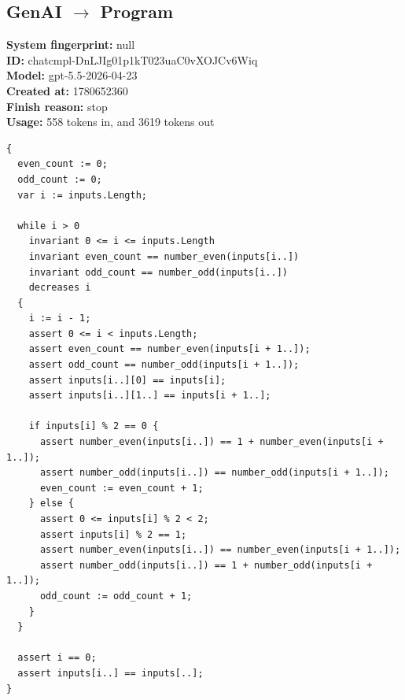 \documentclass{article}
\begin{document}
\subsection*{GenAI $\rightarrow$ Program}
\textbf{System fingerprint: }null
\\\textbf{ID: }chatcmpl-DnLJIg01p1kT023uaC0vXOJCv6Wiq
\\\textbf{Model: }gpt-5.5-2026-04-23
\\\textbf{Created at: }1780652360
\\\textbf{Finish reason: }stop
\\\textbf{Usage: }558 tokens in, and 3619 tokens out
\begin{lstlisting}
{
  even_count := 0;
  odd_count := 0;
  var i := inputs.Length;

  while i > 0
    invariant 0 <= i <= inputs.Length
    invariant even_count == number_even(inputs[i..])
    invariant odd_count == number_odd(inputs[i..])
    decreases i
  {
    i := i - 1;
    assert 0 <= i < inputs.Length;
    assert even_count == number_even(inputs[i + 1..]);
    assert odd_count == number_odd(inputs[i + 1..]);
    assert inputs[i..][0] == inputs[i];
    assert inputs[i..][1..] == inputs[i + 1..];

    if inputs[i] % 2 == 0 {
      assert number_even(inputs[i..]) == 1 + number_even(inputs[i + 1..]);
      assert number_odd(inputs[i..]) == number_odd(inputs[i + 1..]);
      even_count := even_count + 1;
    } else {
      assert 0 <= inputs[i] % 2 < 2;
      assert inputs[i] % 2 == 1;
      assert number_even(inputs[i..]) == number_even(inputs[i + 1..]);
      assert number_odd(inputs[i..]) == 1 + number_odd(inputs[i + 1..]);
      odd_count := odd_count + 1;
    }
  }

  assert i == 0;
  assert inputs[i..] == inputs[..];
}
\end{lstlisting}
\end{document}
